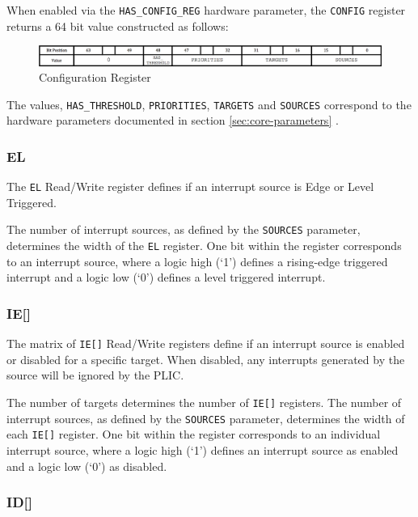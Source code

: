 When enabled via the \texttt{HAS\_CONFIG\_REG} hardware parameter, the
\texttt{CONFIG} register returns a 64 bit value constructed as follows:

\begin{figure}[h] 
	\includegraphics{img/config} 
	\caption[Configuration Register]{Configuration Register}
	\label{fig:configreg}
\end{figure}



The values, \texttt{HAS\_THRESHOLD}, \texttt{PRIORITIES},
\texttt{TARGETS} and \texttt{SOURCES} correspond to the hardware
parameters documented in section \ref{sec:core-parameters} .

\subsubsection{EL}

The \texttt{EL} Read/Write register defines if an interrupt source is
Edge or Level Triggered.

The number of interrupt sources, as defined by the
\texttt{SOURCES} parameter, determines
the width of the \texttt{EL} register. One bit within the register
corresponds to an interrupt source, where a logic high (`1') defines a
rising-edge triggered interrupt and a logic low (`0') defines a level
triggered interrupt.

\subsubsection{IE[]}

The matrix of \texttt{IE[]} Read/Write registers define if an
interrupt source is enabled or disabled for a specific target. When
disabled, any interrupts generated by the source will be ignored by the
PLIC.

The number of targets determines the number of \texttt{IE[]}
registers. The number of interrupt sources, as defined by the
\texttt{SOURCES} parameter, determines the
width of each \texttt{IE[]} register. One bit within the register
corresponds to an individual interrupt source, where a logic high (`1')
defines an interrupt source as enabled and a logic low (`0') as
disabled.

\subsubsection{ID[]}

